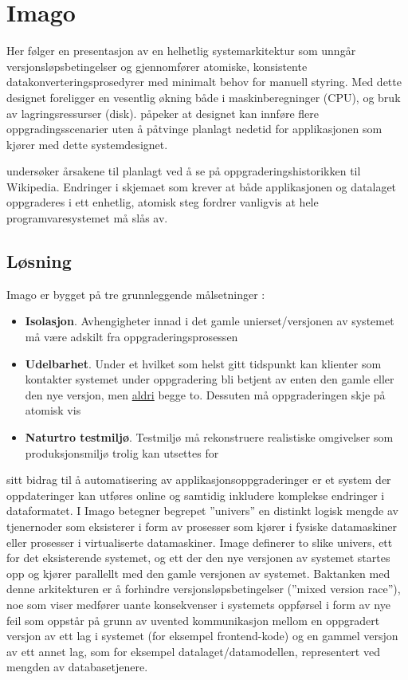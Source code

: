 \section{Imago}

Her følger en presentasjon av en helhetlig systemarkitektur som unngår versjonsløpsbetingelser og gjennomfører atomiske, konsistente datakonverteringsprosedyrer med minimalt behov for manuell styring. Med dette designet foreligger en vesentlig økning både i maskinberegninger (CPU), og bruk av lagringsressurser (disk). \cite{dumitras2009nodowntime} påpeker at designet kan innføre flere oppgradingsscenarier uten å påtvinge planlagt nedetid for applikasjonen som kjører med dette systemdesignet.

\cite{dumitras2009nodowntime} undersøker årsakene til planlagt ved å se på oppgraderingshistorikken til Wikipedia. Endringer i skjemaet som krever at både applikasjonen og datalaget oppgraderes i ett enhetlig, atomisk steg fordrer vanligvis at hele programvaresystemet må slås av.

\subsection{Løsning}
Imago er bygget på tre grunnleggende målsetninger \cite{dumitracs2009upgrades}:
\begin{itemize}
  \item \textbf{Isolasjon}. Avhengigheter innad i det gamle unierset/versjonen av systemet må være adskilt fra oppgraderingsprosessen
  \item \textbf{Udelbarhet}. Under et hvilket som helst gitt tidspunkt kan klienter som kontakter systemet under oppgradering bli betjent av enten den gamle eller den nye versjon, men \underline{aldri} begge to. Dessuten må oppgraderingen skje på atomisk vis
  \item \textbf{Naturtro testmiljø}. Testmiljø må rekonstruere realistiske omgivelser som produksjonsmiljø trolig kan utsettes for
\end{itemize}

\cite{dumitracs2009upgrades} sitt bidrag til å automatisering av applikasjonsoppgraderinger er et system der oppdateringer kan utføres online og samtidig inkludere komplekse endringer i dataformatet. I Imago betegner begrepet ''univers'' en distinkt logisk mengde av tjenernoder som eksisterer i form av prosesser som kjører i fysiske datamaskiner eller prosesser i virtualiserte datamaskiner. Image definerer to slike univers, ett for det eksisterende systemet, og ett der den nye versjonen av systemet startes opp og kjører parallellt med den gamle versjonen av systemet. Baktanken med denne arkitekturen er å forhindre versjonsløpsbetingelser (''mixed version race''), noe som \cite{dumitras2010upgrade} viser medfører uante konsekvenser i systemets oppførsel i form av nye feil som oppstår på grunn av uvented kommunikasjon mellom en oppgradert versjon av ett lag i systemet (for eksempel frontend-kode) og en gammel versjon av ett annet lag, som for eksempel datalaget/datamodellen, representert ved mengden av databasetjenere.

